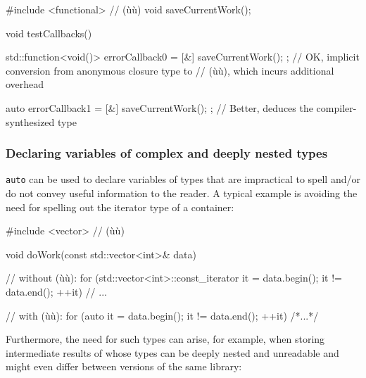 \begin{emcppshiddenlisting}[emcppsbatch=e8]
#include <functional>      // (ù{}ù)
void saveCurrentWork();
\end{emcppshiddenlisting}
\begin{emcppslisting}[emcppsbatch=e8]
void testCallbacks()
{
    std::function<void()> errorCallback0 = [&]{ saveCurrentWork(); };
        // OK, implicit conversion from anonymous closure type to
        // (ù{}ù), which incurs additional overhead

    auto errorCallback1 = [&]{ saveCurrentWork(); };
        // Better, deduces the compiler-synthesized type
}
\end{emcppslisting}


\subsubsection[Declaring variables of complex and deeply nested types]{Declaring variables of complex and deeply nested types}\label{declaring-variables-of-complex-and-deeply-nested-types}

\lstinline!auto! can be used to declare variables of types that are impractical to spell and/or do not convey useful information to the reader.  A typical example is avoiding the
need for spelling out the iterator type of a container:

\begin{emcppshiddenlisting}[emcppsbatch=e9]
#include <vector>      // (ù{}ù)
\end{emcppshiddenlisting}
\begin{emcppslisting}[emcppsbatch=e9]
void doWork(const std::vector<int>& data)
{
    // without (ù{}ù):
    for (std::vector<int>::const_iterator it = data.begin();
         it != data.end();
         ++it) {
        // ...
    }

    // with (ù{}ù):
    for (auto it = data.begin(); it != data.end(); ++it) { /*...*/ }
}
\end{emcppslisting}

\noindent Furthermore, the need for such types can arise, for example, when
storing intermediate results of  whose types can
be deeply nested and unreadable and might even differ between versions of
the same library:

